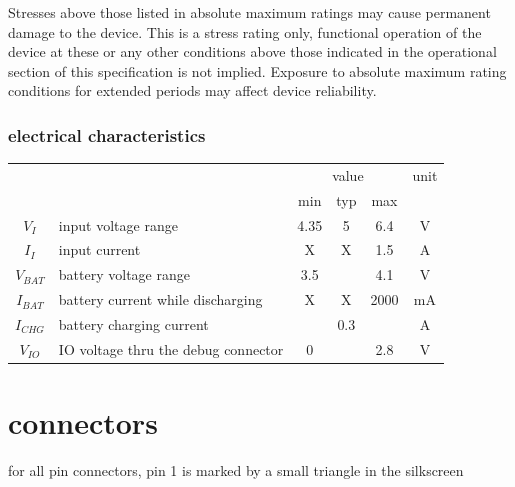 \documentclass[a4paper,twoside]{refart}
\begin{document}
Stresses above those listed in absolute maximum ratings may cause permanent damage to the device. This is a stress rating only, functional operation of the device at these or any other conditions above those indicated in the operational section of this specification is not implied. Exposure to absolute maximum rating conditions for extended periods may affect device reliability.

\subsubsection{electrical characteristics}

\begin{tabular}{ |c|l|c|c|c|c| }
    \hline
    \multicolumn{2}{|c|}{} & \multicolumn{3}{|c|}{value} & unit \\ \cline{3-6}
    \multicolumn{2}{|c|}{} & min & typ & max & \\ \hline
    $V_{I}$ & input voltage range                      & 4.35  & 5     & 6.4  & V \\ \hline
    $I_{I}$ & input current                            & X     & X     & 1.5  & A \\ \hline
    $V_{BAT}$ & battery voltage range                  & 3.5   &       & 4.1  & V \\ \hline
    $I_{BAT}$ & battery current while discharging      & X     & X     & 2000 & mA \\ \hline
    $I_{CHG}$ & battery charging current \footnotemark &       & 0.3   &   & A \\ \hline
    $V_{IO}$ & IO voltage thru the debug connector     & 0     &       & 2.8  & V \\ \hline
\end{tabular}


\section{connectors}
for all pin connectors, pin 1 is marked by a small triangle in the silkscreen
\end{document}
